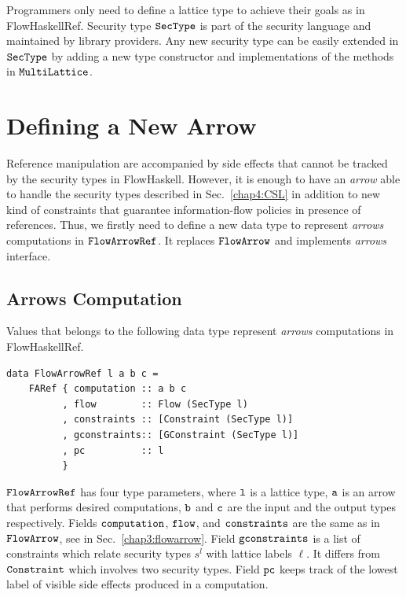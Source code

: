\documentclass{report}
\newcommand{\co}[1]{$\cod{#1}$}
\newcommand{\st}{s^l}
\begin{document}
Programmers only need to define a lattice type to achieve their goals as in FlowHaskellRef. 
Security type \co{SecType} is part of the security language and 
maintained by library providers. Any new security type can be easily extended 
in \co{SecType} by adding a new type constructor and implementations of the methods
in \co{MultiLattice}.


\section{Defining a New Arrow}


Reference manipulation are accompanied by side effects that cannot be tracked
by the security types in FlowHaskell.  
However, it is enough to have an {\em arrow} able to handle the security types described in
Sec.~\ref{chap4:CSL} in addition to new kind of constraints that guarantee information-flow
policies in presence of references. 
Thus, we firstly need to define a new data type to represent {\em arrows} computations in
\co{FlowArrowRef}.
It replaces \co{FlowArrow} and implements {\em arrows} interface.

\subsection{Arrows Computation}
\label{chap4:flowarrowref:concept}
Values that belongs to the following data type represent {\em arrows} computations
in FlowHaskellRef.
\begin{Verbatim}[fontsize=\small]
data FlowArrowRef l a b c = 
    FARef { computation :: a b c
          , flow        :: Flow (SecType l)
          , constraints :: [Constraint (SecType l)]
          , gconstraints:: [GConstraint (SecType l)]
          , pc          :: l
          }
\end{Verbatim}
\co{FlowArrowRef} has four type parameters, where \co{l} is a lattice type,
\co{a} is an arrow that performs desired computations, \co{b} and \co{c} are the
input and the output types respectively. Fields \co{computation}, \co{flow}, and \co{constraints}
are the same as in \co{FlowArrow}, see in Sec.~\ref{chap3:flowarrow}.
Field \co{gconstraints} is a list of constraints which relate
security types $\st$ with lattice labels $\ell$. It differs from \co{Constraint} which involves
two security types.
Field \co{pc} keeps track of the lowest label of visible side effects produced in a computation. 
\end{document}
